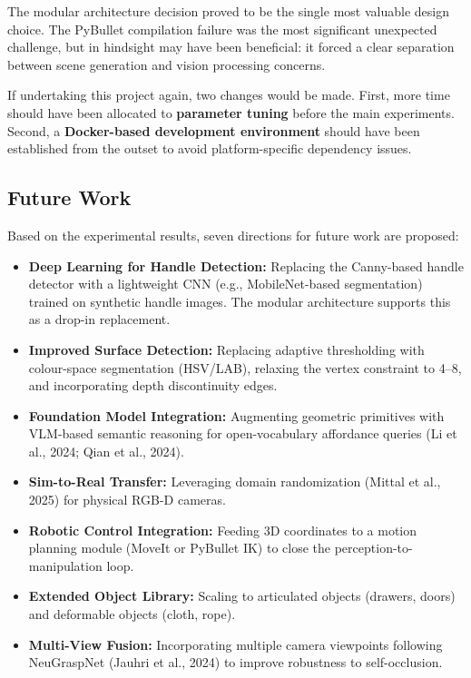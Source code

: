 \documentclass[11pt,a4paper]{article}
\begin{document}
The modular architecture decision proved to be the single most valuable design choice. The PyBullet compilation failure was the most significant unexpected challenge, but in hindsight may have been beneficial: it forced a clear separation between scene generation and vision processing concerns.

If undertaking this project again, two changes would be made. First, more time should have been allocated to \textbf{parameter tuning} before the main experiments. Second, a \textbf{Docker-based development environment} should have been established from the outset to avoid platform-specific dependency issues.

\subsection{Future Work}

Based on the experimental results, seven directions for future work are proposed:

\begin{itemize}[leftmargin=1.2cm]
  \item \textbf{Deep Learning for Handle Detection:} Replacing the Canny-based handle detector with a lightweight CNN (e.g., MobileNet-based segmentation) trained on synthetic handle images. The modular architecture supports this as a drop-in replacement.
  \item \textbf{Improved Surface Detection:} Replacing adaptive thresholding with colour-space segmentation (HSV/LAB), relaxing the vertex constraint to 4--8, and incorporating depth discontinuity edges.
  \item \textbf{Foundation Model Integration:} Augmenting geometric primitives with VLM-based semantic reasoning for open-vocabulary affordance queries (Li et al., 2024; Qian et al., 2024).
  \item \textbf{Sim-to-Real Transfer:} Leveraging domain randomization (Mittal et al., 2025) for physical RGB-D cameras.
  \item \textbf{Robotic Control Integration:} Feeding 3D coordinates to a motion planning module (MoveIt or PyBullet IK) to close the perception-to-manipulation loop.
  \item \textbf{Extended Object Library:} Scaling to articulated objects (drawers, doors) and deformable objects (cloth, rope).
  \item \textbf{Multi-View Fusion:} Incorporating multiple camera viewpoints following NeuGraspNet (Jauhri et al., 2024) to improve robustness to self-occlusion.
\end{itemize}
\end{document}
